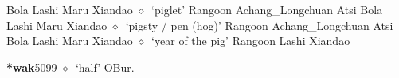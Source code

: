 \begin{list}{}{\leftmargin=1.5em \itemindent=-1.5em}
\hspace{1ex}
         Bola 
\hspace{1ex}
         Lashi 
\hspace{1ex}
         Maru 
\hspace{1ex}
         Xiandao 
\hspace{1ex}
         $\diamond$~`piglet'
         Rangoon 
\hspace{1ex}
         Achang\_Longchuan 
\hspace{1ex}
         Atsi 
\hspace{1ex}
         Bola 
\hspace{1ex}
         Lashi 
\hspace{1ex}
         Maru 
\hspace{1ex}
         Xiandao 
\hspace{1ex}
         $\diamond$~`pigsty / pen (hog)'
         Rangoon 
\hspace{1ex}
         Achang\_Longchuan 
\hspace{1ex}
         Atsi 
\hspace{1ex}
         Bola 
\hspace{1ex}
         Lashi 
\hspace{1ex}
         Maru 
\hspace{1ex}
         Xiandao 
\hspace{1ex}
         $\diamond$~`year of the pig'
         Rangoon 
\hspace{1ex}
         Lashi 
\hspace{1ex}
         Xiandao 
  \item {\footnotesize \textbf{*wak}}{\tiny 5099}
\hspace{1ex}
         $\diamond$~`half'
         OBur. 

\end{list}
